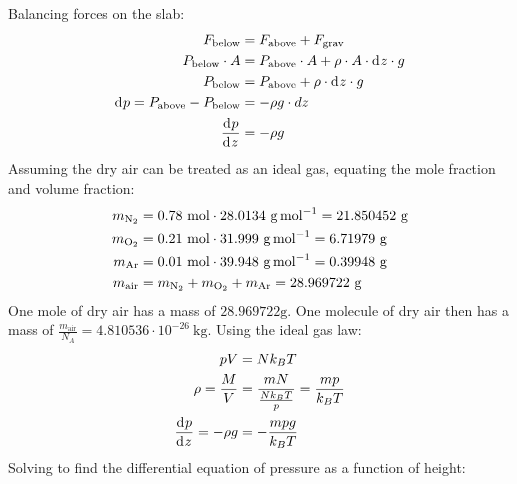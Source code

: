 \documentclass{article}
\begin{document}
Balancing forces on the slab:
\begin{equation}
    \begin{split}
        F_{\text{below}} & = F_{\text{above}} + F_{\text{grav}} \\
        P_{\text{below}} \cdot A & = P_{\text{above}} \cdot A + \rho \cdot A \cdot \diff{z} \cdot g \\
        P_{\text{below}} & = P_{\text{above}} + \rho \cdot \diff{z} \cdot g \\
        \diff{p} = P_{\text{above}} - P_{\text{below}} & = -\rho g \cdot dz \\
        \deriv{p}{z} & = -\rho g
    \end{split}
\end{equation}
Assuming the dry air can be treated as an ideal gas, equating the mole fraction and volume fraction:
\begin{equation}
    \begin{split}
        m_{\ce{N2}} & = 0.78~\unit{\mole} \cdot 28.0134~\unit{\gram\per\mole} = 21.850452~\unit{\gram} \\
        m_{\ce{O2}} & = 0.21~\unit{\mole} \cdot 31.999~\unit{\gram\per\mole} = 6.71979~\unit{\gram} \\
        m_{\ce{Ar}} & = 0.01~\unit{\mole}\cdot 39.948~\unit{\gram\per\mole} = 0.39948~\unit{\gram} \\
        m_{\text{air}} & = m_{\ce{N2}} + m_{\ce{O2}} + m_{\ce{Ar}} = 28.969722~\unit{\gram}
    \end{split}
\end{equation}
One mole of dry air has a mass of $28.969722 \unit{\gram}$. One molecule of dry air then has a mass of $\frac{m_{\text{air}}}{N_A} = 4.810536 \cdot 10^{-26}~\unit{\kilo\gram}$.
Using the ideal gas law:
\begin{equation}
    \begin{split}
        pV & = Nk_B T \\
        \rho = \frac{M}{V} & = \frac{mN}{\frac{Nk_B T}{p}} = \frac{mp}{k_B T} \\
        \deriv{p}{z} = -\rho g & = -\frac{mpg}{k_B T}
    \end{split}
\end{equation}
Solving to find the differential equation of pressure as a function of height:
\end{document}
